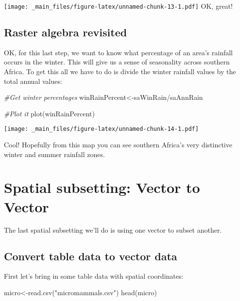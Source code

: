 \documentclass[
]{book}
\newenvironment{Shaded}{\begin{snugshade}}{\end{snugshade}}
\newcommand{\CommentTok}[1]{\textcolor[rgb]{0.56,0.35,0.01}{\textit{#1}}}
\newcommand{\FunctionTok}[1]{\textcolor[rgb]{0.00,0.00,0.00}{#1}}
\newcommand{\NormalTok}[1]{#1}
\newcommand{\OtherTok}[1]{\textcolor[rgb]{0.56,0.35,0.01}{#1}}
\newcommand{\SpecialCharTok}[1]{\textcolor[rgb]{0.00,0.00,0.00}{#1}}
\newcommand{\StringTok}[1]{\textcolor[rgb]{0.31,0.60,0.02}{#1}}
\begin{document}
\texttt{[image: \_main\_files/figure-latex/unnamed-chunk-13-1.pdf]}
OK, great!

\hypertarget{raster-algebra-revisited}{%
\section{Raster algebra revisited}\label{raster-algebra-revisited}}

OK, for this last step, we want to know what percentage of an area's rainfall occurs in the winter. This will give us a sense of seasonality across southern Africa. To get this all we have to do is divide the winter rainfall values by the total annual values:

\begin{Shaded}
\begin{Highlighting}[]
\CommentTok{\#Get winter percentages}
\NormalTok{winRainPercent}\OtherTok{\textless{}{-}}\NormalTok{saWinRain}\SpecialCharTok{/}\NormalTok{saAnnRain}

\CommentTok{\#Plot it}
\FunctionTok{plot}\NormalTok{(winRainPercent)}
\end{Highlighting}
\end{Shaded}

\texttt{[image: \_main\_files/figure-latex/unnamed-chunk-14-1.pdf]}

Cool! Hopefully from this map you can see southern Africa's very distinctive winter and summer rainfall zones.

\hypertarget{spatial-subsetting-vector-to-vector}{%
\chapter{Spatial subsetting: Vector to Vector}\label{spatial-subsetting-vector-to-vector}}

The last spatial subsetting we'll do is using one vector to subset another.

\hypertarget{convert-table-data-to-vector-data}{%
\section{Convert table data to vector data}\label{convert-table-data-to-vector-data}}

First let's bring in some table data with spatial coordinates:

\begin{Shaded}
\begin{Highlighting}[]
\NormalTok{micro}\OtherTok{\textless{}{-}}\FunctionTok{read.csv}\NormalTok{(}\StringTok{"micromammals.csv"}\NormalTok{)}
\FunctionTok{head}\NormalTok{(micro)}
\end{Highlighting}
\end{Shaded}
\end{document}
